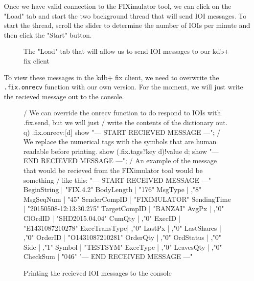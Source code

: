 Once we have valid connection to the FIXimulator tool, we can click on the "Load" tab and start the
two background thread that will send IOI messages. To start the thread, scroll the slider to determine
the number of IOIs per minute and then click the "Start" button.

\begin{figure}[H]
\centering
{}
\caption{The "Load" tab that will allow us to send IOI messages to our kdb+ fix client}
\label{fig:fiximulator-load-tab}
\end{figure}

To view these messages in the kdb+ fix client, we need to overwrite the \texttt{.fix.onrecv}
function with our own version. For the moment, we will just write the recieved message out to the 
console.

\begin{figure}[H]
\begin{qcode}
/ We can override the onrecv function to do respond to IOIs with .fix.send, but we will just
/ write the contents of the dictionary out.
q) .fix.onrecv:{[d]
	show "--- START RECIEVED MESSAGE ---"; 
	/ We replace the numerical tags with the symbols that are human readable before printing.
	show (.fix.tags?key d)!value d;
	show "---  END RECIEVED MESSAGE  ---";}
/ An example of the message that would be recieved from the FIXimulator tool would be something
/ like this:
"--- START RECEIVED MESSAGE ---"
BeginString  | "FIX.4.2"
BodyLength   | "176"
MsgType      | ,"8"
MsgSeqNum    | "45"
SenderCompID | "FIXIMULATOR"
SendingTime  | "20150508-12:13:30.275"
TargetCompID | "BANZAI"
AvgPx        | ,"0"
ClOrdID      | "SHD2015.04.04"
CumQty       | ,"0"
ExecID       | "E1431087210278"
ExecTransType| ,"0"
LastPx       | ,"0"
LastShares   | ,"0"
OrderID      | "O1431087210281"
OrderQty     | ,"0"
OrdStatus    | ,"0"
Side         | ,"1"
Symbol       | "TESTSYM"
ExecType     | ,"0"
LeavesQty    | ,"0"
CheckSum     | "046"
"---  END RECEIVED MESSAGE  ---"
\end{qcode}
\caption{Printing the recieved IOI messages to the console}
\end{figure}

